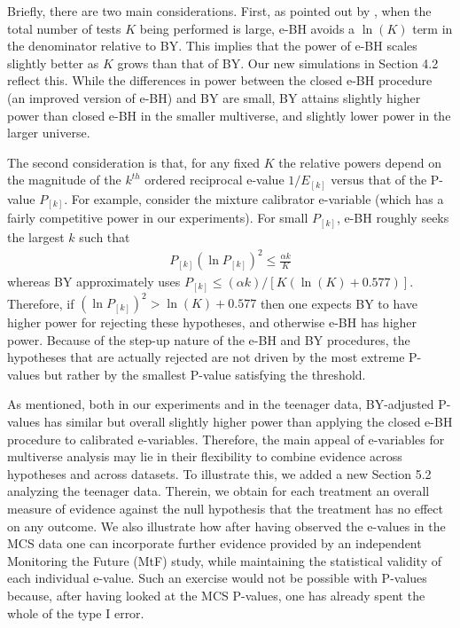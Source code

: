 \documentclass[11pt, a4paper]{article}
\begin{document}
\begin{enumerate}[leftmargin=*]
Briefly, there are two main considerations. First, as pointed out by \cite{wang_ruodu:2022}, when the total number of tests $K$ being performed is large, e-BH avoids a $\ln(K)$ term in the denominator relative to BY. This implies that the power of e-BH scales slightly better as $K$ grows than that of BY.
Our new simulations in Section 4.2 reflect this. While the differences in power between the closed e-BH procedure (an improved version of e-BH) and BY are small, BY attains slightly higher power than closed e-BH in the smaller multiverse, and slightly lower power in the larger universe.

The second consideration is that, for any fixed $K$ the relative powers depend on the magnitude of the $k^{th}$ ordered reciprocal e-value $1/E_{[k]}$ versus that of the P-value $P_{[k]}$. For example, consider the mixture calibrator e-variable (which has a fairly competitive power in our experiments).
For small $P_{[k]}$, e-BH roughly seeks the largest $k$ such that
\begin{align}
 P_{[k]} (\ln P_{[k]})^2 \leq \frac{\alpha k}{K}
\nonumber
\end{align}
whereas BY approximately uses $P_{[k]} \leq (\alpha k)/[K (\ln(K) + 0.577)]$.
Therefore, if $(\ln P_{[k]})^2 > \ln(K) + 0.577$ then one expects BY to have higher power for rejecting these hypotheses, and otherwise e-BH has higher power. Because of the step-up nature of the e-BH and BY procedures, the hypotheses that are actually rejected are not driven by the most extreme P-values but rather by the smallest P-value satisfying the threshold.

As mentioned, both in our experiments and in the teenager data, BY-adjusted P-values has similar but overall slightly higher power than applying the closed e-BH procedure to calibrated e-variables.
Therefore, the main appeal of e-variables for multiverse analysis may lie in their flexibility to combine evidence across hypotheses and across datasets.
To illustrate this, we added a new Section 5.2 analyzing the teenager data. Therein, we obtain for each treatment an overall measure of evidence against the null hypothesis that the treatment has no effect on any outcome. We also illustrate how after having observed the e-values in the MCS data one can incorporate further evidence provided by an independent Monitoring the Future (MtF) study, while maintaining the statistical validity of each individual e-value. Such an exercise would not be possible with P-values because, after having looked at the MCS P-values, one has already spent the whole of the type I error.




\end{enumerate}
\end{document}
